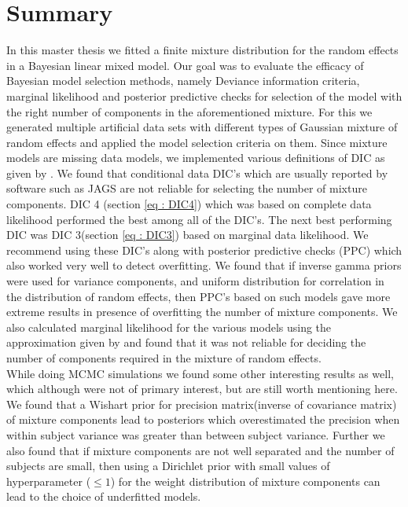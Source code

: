 
\chapter{Summary}
\label{ch : summary}

In this master thesis we fitted a finite mixture distribution for the random effects in a Bayesian linear mixed model. Our goal was to evaluate the efficacy of Bayesian model selection methods, namely Deviance information criteria, marginal likelihood and posterior predictive checks for selection of the model with the right number of components in the aforementioned mixture. For this we generated multiple artificial data sets with different types of Gaussian mixture of random effects and applied the model selection criteria on them. Since mixture models are missing data models, we implemented various definitions of DIC as given by \citet{celeux_deviance_2006}. We found that conditional data DIC's which are usually reported by software such as JAGS are not reliable for selecting the number of mixture components. DIC 4 (section \ref{eq : DIC4}) which was based on complete data likelihood performed the best among all of the DIC's. The next best performing DIC was DIC 3(section \ref{eq : DIC3}) based on marginal data likelihood. We recommend using these DIC's along with posterior predictive checks (PPC) which also worked very well to detect overfitting. We found that if inverse gamma priors were used for variance components, and uniform distribution for correlation in the distribution of random effects, then PPC's based on such models gave more extreme results in presence of overfitting the number of mixture components. We also calculated marginal likelihood for the various models using the approximation given by \citet{chib_marginal_1995} and found that it was not reliable for deciding the number of components required in the mixture of random effects.\\

While doing MCMC simulations we found some other interesting results as well, which although were not of primary interest, but are still worth mentioning here. We found that a Wishart prior for precision matrix(inverse of covariance matrix) of mixture components lead to posteriors which overestimated the precision when within subject variance was greater than between subject variance. Further we also found that if mixture components are not well separated and the number of subjects are small, then using a Dirichlet prior with small values of hyperparameter ($\leq 1$) for the weight distribution of mixture components can lead to the choice of underfitted models.